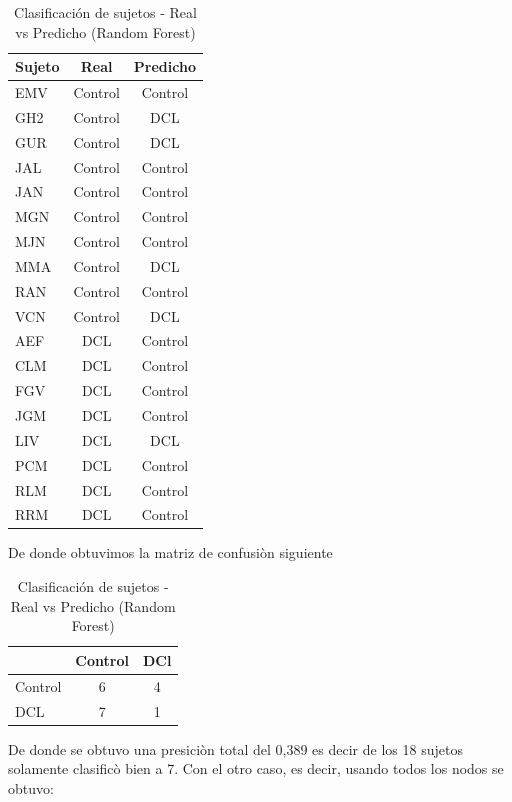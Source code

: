 \begin{table}[H]
\centering
\caption{Clasificación de sujetos - Real vs Predicho (Random Forest)}
\label{tab:clasificacion_rf}
\begin{tabular}{lcc}
\toprule
\textbf{Sujeto} & \textbf{Real} & \textbf{Predicho} \\
\midrule
EMV  & Control & Control \\
GH2  & Control & DCL \\
GUR  & Control & DCL \\
JAL  & Control & Control \\
JAN  & Control & Control \\
MGN  & Control & Control \\
MJN  & Control & Control \\
MMA  & Control & DCL \\
RAN  & Control & Control \\
VCN  & Control & DCL \\
AEF  & DCL     & Control \\
CLM  & DCL     & Control \\
FGV  & DCL     & Control \\
JGM  & DCL     & Control \\
LIV  & DCL     & DCL \\
PCM  & DCL     & Control \\
RLM  & DCL     & Control \\
RRM  & DCL     & Control \\
\bottomrule
\end{tabular}
\end{table}

De donde obtuvimos la matriz de confusiòn siguiente

\begin{table}[H]
\centering
\caption{Clasificación de sujetos - Real vs Predicho (Random Forest)}
\label{tab:clasificacion5_rf}
\begin{tabular}{lcc}
\toprule
\textbf{} & \textbf{Control} & \textbf{DCl} \\
\midrule
Control & 6 & 4 \\
DCL  & 7 & 1 \\
\bottomrule
\end{tabular}
\end{table}

De donde se obtuvo una presiciòn total del 0,389 es decir de los 18 sujetos solamente clasificò
bien a 7.
Con el otro caso, es decir, usando todos los nodos se obtuvo:

